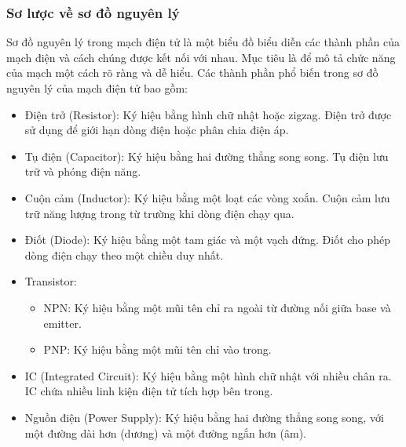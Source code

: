 \documentclass{article}
\begin{document}
\subsubsection{Sơ lược về sơ đồ nguyên lý}
    Sơ đồ nguyên lý trong mạch điện tử là một biểu đồ biểu diễn các thành phần của
mạch điện và cách chúng được kết nối với nhau. Mục tiêu là để mô tả chức năng của
mạch một cách rõ ràng và dễ hiểu. Các thành phần phổ biến trong sơ đồ nguyên lý của
mạch điện tử bao gồm:
\begin{itemize}
    \item Điện trở (Resistor): Ký hiệu bằng hình chữ nhật hoặc zigzag. Điện trở được sử dụng để giới hạn dòng điện hoặc phân chia điện áp.
    \item Tụ điện (Capacitor): Ký hiệu bằng hai đường thẳng song song. Tụ điện lưu trữ và phóng điện năng.
    \item Cuộn cảm (Inductor): Ký hiệu bằng một loạt các vòng xoắn. Cuộn cảm lưu trữ năng lượng trong từ trường khi dòng điện chạy qua.
    \item Điốt (Diode): Ký hiệu bằng một tam giác và một vạch đứng. Điốt cho phép dòng điện chạy theo một chiều duy nhất.
    \item Transistor:
    \begin{itemize}
        \item NPN: Ký hiệu bằng một mũi tên chỉ ra ngoài từ đường nối giữa base và emitter.
        \item PNP: Ký hiệu bằng một mũi tên chỉ vào trong.
    \end{itemize}
    \item IC (Integrated Circuit): Ký hiệu bằng một hình chữ nhật với nhiều chân ra. IC chứa nhiều linh kiện điện tử tích hợp bên trong.
    \item Nguồn điện (Power Supply): Ký hiệu bằng hai đường thẳng song song, với một đường dài hơn (dương) và một đường ngắn hơn (âm).
\end{itemize}
\end{document}

